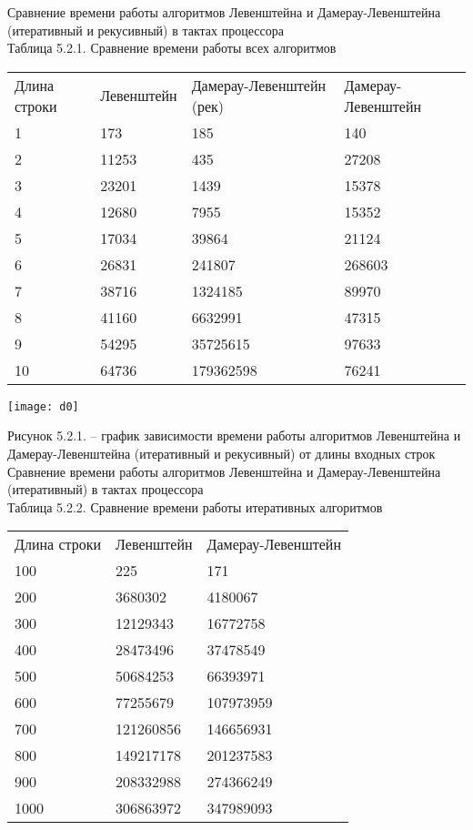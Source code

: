 \documentclass[a4paper, 14pt]{article}
\begin{document}
	Сравнение времени работы алгоритмов Левенштейна и Дамерау-Левенштейна (итеративный и рекусивный) в тактах процессора \\
	
	\small Таблица 5.2.1. Сравнение времени работы всех алгоритмов \normalsize\\
	
	\begin{tabular}{ | l | l | l | l |}
		Длина строки  & Левенштейн & Дамерау-Левенштейн (рек) & Дамерау-Левенштейн \\
		1   &173 &185 &140\\
		2   &11253   &435 &27208\\
		3   &23201   &1439    &15378\\
		4   &12680   &7955    &15352\\
		5   &17034   &39864   &21124\\
		6   &26831   &241807  &268603\\
		7   &38716   &1324185 &89970\\
		8   &41160   &6632991 &47315\\
		9   &54295   &35725615    &97633\\
		10  &64736   &179362598   &76241\\
	\end{tabular}

	\newpage

\texttt{[image: d0]}

\small Рисунок 5.2.1. – график зависимости времени работы алгоритмов Левенштейна и Дамерау-Левенштейна (итеративный и рекусивный) от длины входных строк \normalsize \\

	
	Сравнение времени работы алгоритмов Левенштейна и Дамерау-Левенштейна (итеративный) в тактах процессора \\
	
	\small Таблица 5.2.2. Сравнение времени работы итеративных алгоритмов \normalsize\\
	
	\begin{tabular}{ | l | l | l |}
		Длина строки  & Левенштейн & Дамерау-Левенштейн  \\
		100 &225 &171\\
		200 &3680302 &4180067\\
		300 &12129343    &16772758\\
		400 &28473496    &37478549\\
		500 &50684253    &66393971\\
		600 &77255679    &107973959\\
		700 &121260856   &146656931\\
		800 &149217178   &201237583\\
		900 &208332988   &274366249\\
		1000    &306863972   &347989093\\
	\end{tabular} \\\\
\end{document}

